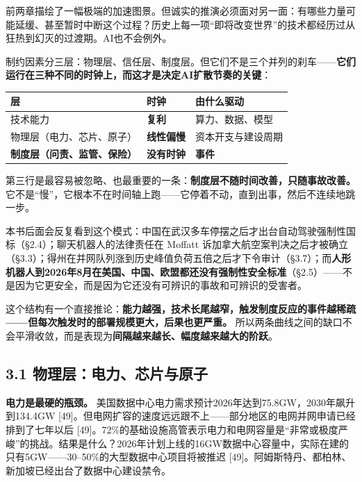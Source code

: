 \documentclass[11pt,a4paper]{ctexart}
\begin{document}
前两章描绘了一幅极端的加速图景。但诚实的推演必须面对另一面：有哪些力量可能延缓、甚至暂时中断这个过程？历史上每一项“即将改变世界”的技术都经历过从狂热到幻灭的过渡期。AI也不会例外。

制约因素分三层：物理层、信任层、制度层。但它们不是三个并列的刹车——\textbf{它们运行在三种不同的时钟上，而这才是决定AI扩散节奏的关键}：

\begin{center}

\begin{tabularx}{\textwidth}{lXX}
\toprule
层 & 时钟 & 由什么驱动 \\
\midrule
技术能力 & \textbf{复利} & 算力、数据、模型 \\
物理层（电力、芯片、原子） & \textbf{线性偏慢} & 资本开支与建设周期 \\
\textbf{制度层（问责、监管、保险）} & \textbf{没有时钟} & \textbf{事件} \\
\bottomrule
\end{tabularx}
\end{center}

第三行是最容易被忽略、也最重要的一条：\textbf{制度层不随时间改善，只随事故改善。} 它不是“慢”，它根本不在时间轴上跑——它停着不动，直到出事，然后不连续地跳一步。

本书后面会反复看到这个模式：中国在武汉多车停摆之后才出台自动驾驶强制性国标（\S{}2.4）；聊天机器人的法律责任在 Moffatt 诉加拿大航空案判决之后才被确立（\S{}3.3）；得州在并网队列涨到历史峰值负荷五倍之后才下令审计（\S{}3.7）；而\textbf{人形机器人到2026年8月在美国、中国、欧盟都还没有强制性安全标准}（\S{}2.5）——不是因为它更安全，而是因为它还没有可辨识的事故和可辨识的受害者。

这个结构有一个直接推论：\textbf{能力越强，技术长尾越窄，触发制度反应的事件越稀疏——但每次触发时的部署规模更大，后果也更严重。} 所以两条曲线之间的缺口不会平滑收敛，而是表现为\textbf{间隔越来越长、幅度越来越大的阶跃}。

\subsection{3.1 物理层：电力、芯片与原子}

\textbf{电力是最硬的瓶颈。} 美国数据中心电力需求预计2026年达到75.8GW，2030年飙升到134.4GW [49]。但电网扩容的速度远远跟不上——部分地区的电网并网申请已经排到了七年以后 [49]。72\%的基础设施高管表示电力和电网容量是“非常或极度严峻”的挑战。结果是什么？2026年计划上线的16GW数据中心容量中，实际在建的只有5GW——30--50\%的大型数据中心项目将被推迟 [49]。阿姆斯特丹、都柏林、新加坡已经出台了数据中心建设禁令。
\end{document}
